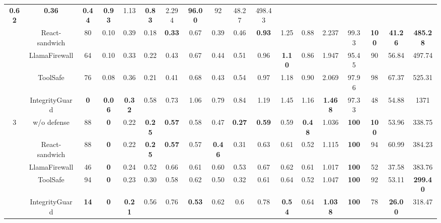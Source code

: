 \begin{table}[t]
\begin{tabular}{c|cccc|cccc|cccc|ccccc}
  \textbf{0.62} &
  \textbf{0.36} &
  \textbf{0.44} &
  \textbf{0.93} &
  1.13 &
  \textbf{0.83} &
  2.294 &
  \textbf{96.00} &
  92 &
  48.27 &
  498.43 \\
 &
  React-sandwich &
  80 &
  0.10 &
  0.39 &
  0.18 &
  \textbf{0.33} &
  0.67 &
  0.39 &
  0.46 &
  \textbf{0.93} &
  1.25 &
  0.88 &
  2.237 &
  99.33 &
  \textbf{100} &
  \textbf{41.26} &
  \textbf{485.28} \\
 &
  LlamaFirewall &
  64 &
  0.10 &
  0.33 &
  0.22 &
  0.43 &
  0.67 &
  0.44 &
  0.51 &
  0.96 &
  \textbf{1.10} &
  0.86 &
  1.947 &
  95.45 &
  90 &
  56.84 &
  497.74 \\
 &
  ToolSafe &
  76 &
  0.08 &
  0.36 &
  0.21 &
  0.41 &
  0.68 &
  0.43 &
  0.54 &
  0.97 &
  1.18 &
  0.90 &
  2.069 &
  97.96 &
  98 &
  67.37 &
  525.31 \\
 &
  IntegrityGuard &
  \textbf{0} &
  \textbf{0.06} &
  \textbf{0.32} &
  0.58 &
  0.73 &
  1.06 &
  0.79 &
  0.84 &
  1.19 &
  1.45 &
  1.16 &
  \textbf{1.468} &
  97.33 &
  48 &
  54.88 &
  1371 \\ \midrule \midrule
\multirow{5}{*}{3} &
  w/o defense &
  88 &
  \textbf{0} &
  0.22 &
  \textbf{0.25} &
  \textbf{0.57} &
  0.58 &
  0.47 &
  \textbf{0.27} &
  \textbf{0.59} &
  0.59 &
  \textbf{0.48} &
  1.036 &
  \textbf{100} &
  \textbf{100} &
  53.96 &
  338.75 \\
 &
  React-sandwich &
  88 &
  \textbf{0} &
  0.22 &
  \textbf{0.25} &
  \textbf{0.57} &
  0.57 &
  \textbf{0.46} &
  0.31 &
  0.63 &
  0.61 &
  0.52 &
  1.115 &
  \textbf{100} &
  94 &
  60.99 &
  384.23 \\
 &
  LlamaFirewall &
  46 &
  \textbf{0} &
  0.24 &
  0.52 &
  0.66 &
  0.61 &
  0.60 &
  0.53 &
  0.67 &
  0.62 &
  0.61 &
  1.017 &
  \textbf{100} &
  52 &
  37.58 &
  383.76 \\
 &
  ToolSafe &
  94 &
  \textbf{0} &
  0.23 &
  0.30 &
  0.58 &
  0.62 &
  0.50 &
  0.32 &
  0.61 &
  0.64 &
  0.52 &
  1.047 &
  \textbf{100} &
  92 &
  53.11 &
  \textbf{299.40} \\
 &
  IntegrityGuard &
  \textbf{14} &
  \textbf{0} &
  \textbf{0.21} &
  0.56 &
  0.76 &
  \textbf{0.53} &
  0.62 &
  0.6 &
  0.78 &
  \textbf{0.54} &
  0.64 &
  \textbf{1.038} &
  \textbf{100} &
  78 &
  \textbf{26.00} &
  318.47 \\ \midrule \midrule
\end{tabular}
\end{table}